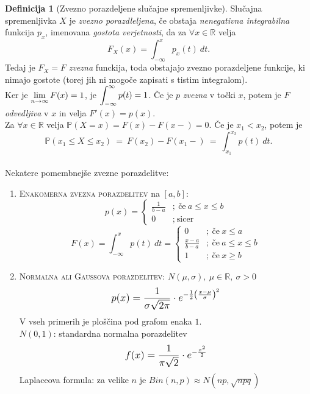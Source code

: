 \documentclass[11pt]{article}
\theoremstyle{definition}
\newtheorem{definicija}{Definicija}[section]
\theoremstyle{definition}
\theoremstyle{definition}
\begin{document}
\begin{definicija}[Zvezno porazdeljene slučajne spremenljivke]

Slučajna spremenljivka $X$ je \textit{zvezno porazdleljena}, če obstaja \textit{nenegativna integrabilna} funkcija $p_x$, imenovana \textit{gostota verjetnosti}, da za $\forall x \in \mathbb{R}$ velja
$$F_X(x) = \int_{-\infty}^x p_x(t) ~dt.$$
Tedaj je $F_X = F$ \textit{zvezna} funckija, toda obstajajo zvezno porazdeljene funkcije, ki nimajo gostote (torej jih ni mogoče zapisati s tistim integralom). \\

\noindent Ker je $\mathlarger{\lim_{n \rightarrow \infty} F(x) = 1}$, je $\mathlarger{\int_{-\infty}^{\infty} p(t) = 1}$. Če je $p$ \textit{zvezna} v točki $x$, potem je $F$ \textit{odvedljiva} v $x$ in velja $F'(x) = p(x)$. \\

\noindent Za $\forall x \in \mathbb{R}$ velja $\mathbb{P}(X = x) = F(x) - F(x-) = 0$. Če je $x_1 < x_2$, potem je 
$$\mathbb{P}(x_1 \leq X \leq x_2) ~=~ F(x_2) - F(x_1-) ~=~ \int_{x_1}^{x_2} p(t) ~dt.$$ \\

\noindent Nekatere pomembnejše zvezne porazdelitve:
\begin{enumerate}
	\item \textsc{Enakomerna zvezna porazdelitev} na $[a, b]$:
	 $$p(x) = \begin{cases}
	 	\frac{1}{b-a} &; ~\text{če}~ a \leq x \leq b \\
	 	0 &; ~\text{sicer}
	 \end{cases}$$
	 $$F(x) = \int_{-\infty}^x p(t) ~dt = \begin{cases}
	 	0 &; ~\text{če}~ x \leq a \\
	 	\frac{x-a}{b-a} &; ~\text{če}~ a \leq x \leq b \\
	 	1 &; ~\text{če}~ x \geq b
	 \end{cases}$$
	 
	\item \textsc{Normalna ali Gaussova porazdelitev}: $N(\mu, \sigma), ~\mu \in \mathbb{R}, ~\sigma > 0$
	$$\mathlarger{p(x)= \frac{1}{\sigma \sqrt{2 \pi}} \cdot e^{-\frac{1}{2} \left( \frac{x-\mu}{\sigma} \right)^2}}$$
V vseh primerih je ploščina pod grafom enaka $1$. \\

$N(0, 1)$: standardna normalna porazdelitev
$$\mathlarger{f(x) = \frac{1}{\pi \sqrt{2}} \cdot e^{-\frac{x^2}{2}}}$$
Laplaceova formula: za velike $n$ je $Bin(n, p) \approx N(np, \sqrt{npq})$


\end{enumerate}
\end{definicija}
\end{document}
